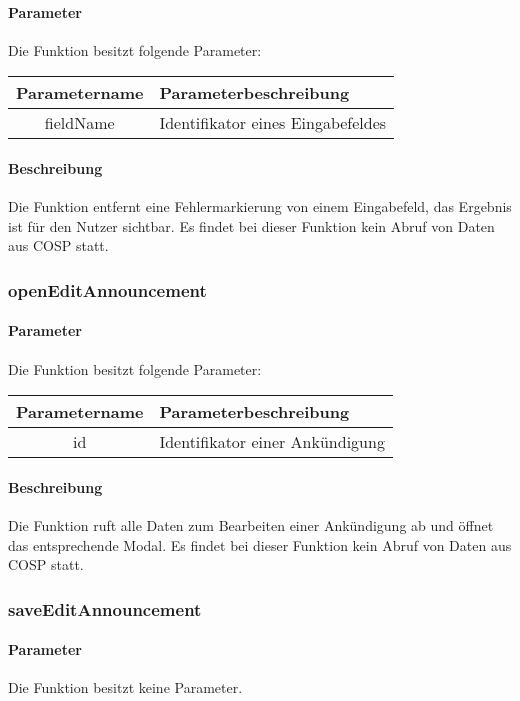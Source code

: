 \paragraph{Parameter} Die Funktion besitzt folgende Parameter:
\begin{table}[H]
	\begin{tabular}{|c|p{11cm}|}
		\hline
		\textbf{Parametername} & \textbf{Parameterbeschreibung} \\ \hline
		fieldName & Identifikator eines Eingabefeldes \\ \hline
	\end{tabular}
\end{table}
\paragraph{Beschreibung} Die Funktion entfernt eine Fehlermarkierung von einem Eingabefeld, das Ergebnis ist für den Nutzer sichtbar. Es findet bei dieser Funktion kein Abruf von Daten aus {\glqq COSP\grqq} statt.
\subsubsection{openEditAnnouncement}
\paragraph{Parameter} Die Funktion besitzt folgende Parameter:
\begin{table}[H]
	\begin{tabular}{|c|p{11cm}|}
		\hline
		\textbf{Parametername} & \textbf{Parameterbeschreibung} \\ \hline
		id & Identifikator einer Ankündigung \\ \hline
	\end{tabular}
\end{table}
\paragraph{Beschreibung} Die Funktion ruft alle Daten zum Bearbeiten einer Ankündigung ab und öffnet das entsprechende Modal. Es findet bei dieser Funktion kein Abruf von Daten aus {\glqq COSP\grqq} statt.
\subsubsection{saveEditAnnouncement}
\paragraph{Parameter} Die Funktion besitzt keine Parameter.
